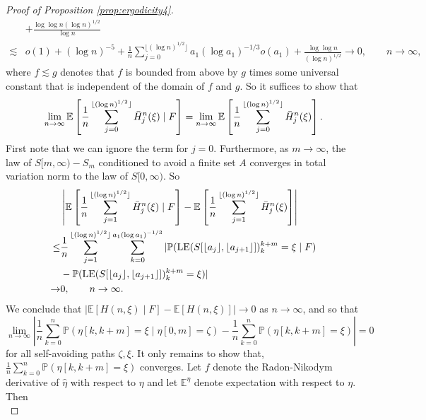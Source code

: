 \documentclass{article}
\DeclareMathOperator{\LE}{LE}
\renewcommand{\P}{\mathbb{P}}
\newcommand{\E}{\mathbb{E}}
\newcommand{\1}{\mathbf{1}}
\newcommand{\limn}{\lim_{n\rightarrow\infty}}
\newcommand{\heta}{\hat\eta}
\theoremstyle{definition}
\numberwithin{equation}{section}
\numberwithin{theorem}{section}
\begin{document}
\begin{proof}[Proof of Proposition \ref{prop:ergodicity4}]
\begin{equation}
\begin{split}
        &+\frac{\log\log n(\log n)^{1/2}}{\log n}\\
        \lesssim&o(1)+(\log n)^{-5}+\frac{1}{n}
        \sum_{j=0}^{\lfloor(\log n)^{1/2}\rfloor}a_{1}(\log a_1)^{-1/3}o(a_1)+\frac{\log\log n}{(\log n)^{1/2}}\rightarrow0,\qquad n\rightarrow\infty,
    \end{split}
\end{equation}
where $f\lesssim g$ denotes that $f$ is bounded from above by $g$ times some universal constant that is independent of the domain of $f$ and $g$. So it suffices to show that
\begin{equation}
	\limn\E\left[\frac{1}{n}\sum_{j=0}^{\lfloor (\log n)^{1/2}\rfloor}\Bar{H}_j^n(\xi)\mid F\right]=\limn\E\left[\frac{1}{n}\sum_{j=0}^{\lfloor (\log n)^{1/2}\rfloor}\Bar{H}_j^n(\xi)\right].
\end{equation}
First note that we can ignore the term for $j=0$. Furthermore, as $m\rightarrow\infty$, the law of $S[m,\infty)-S_m$ conditioned to avoid a finite set $A$ converges in total variation norm to the law of $S[0,\infty)$. So
\begin{equation}
    \begin{split}
        &\left|\E\left[\frac{1}{n}\sum_{j=1}^{\lfloor (\log n)^{1/2}\rfloor}\Bar{H}_j^n(\xi)\mid F\right]-\E\left[\frac{1}{n}\sum_{j=1}^{\lfloor (\log n)^{1/2}\rfloor}\Bar{H}_j^n(\xi)\right]\right|\\
        \leq&\frac{1}{n}\sum_{j=1}^{\lfloor(\log n)^{1/2}\rfloor}\sum_{k=0}^{a_1(\log a_1)^{-1/3}}|\P(\LE(S[\lfloor a_j\rfloor,\lfloor a_{j+1}\rfloor])_k^{k+m}=\xi\mid F)\\
        &-\P(\LE(S[\lfloor a_j\rfloor,\lfloor a_{j+1}\rfloor])_k^{k+m}=\xi)|\\\rightarrow&0, \qquad n\rightarrow\infty.
    \end{split}
\end{equation}
We conclude that $|\E[H(n,\xi)\mid F]-\E[H(n,\xi)]|\rightarrow0$ as $n\rightarrow\infty$, and so that 
\begin{equation}\label{eq:ergodicitysimple}
    \limn\left|\frac{1}{n}\sum_{k=0}^n\P(\eta[k,k+m]=\xi\mid\eta[0,m]=\zeta)-\frac{1}{n}\sum_{k=0}^n\P(\eta[k,k+m]=\xi)\right|=0
\end{equation}
for all self-avoiding paths $\zeta,\xi$. It only remains to show that, $\frac{1}{n}\sum_{k=0}^n\P(\eta[k,k+m]=\xi)$ converges. Let $f$ denote the Radon-Nikodym derivative of $\heta$ with respect to $\eta$ and let $\E^{\eta}$ denote expectation with respect to $\eta$. Then
\begin{equation}

\end{equation}
\end{proof}
\end{document}

